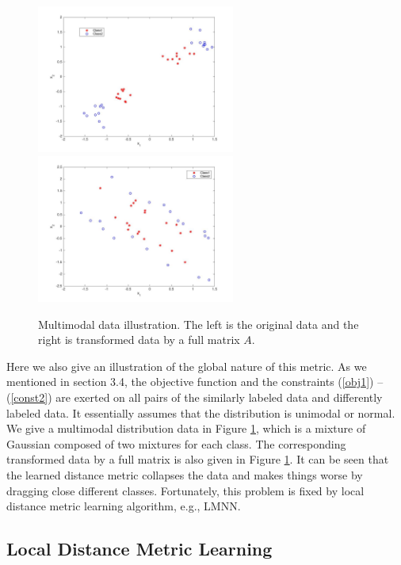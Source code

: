 \documentclass[12pt]{article}
\begin{document}
\begin{figure}[h!]
\centering
\includegraphics[width=6.5cm]{fig/mult-dat.jpg}
\includegraphics[width=6.5cm]{fig/mult-projected.jpg}
\caption{Multimodal data illustration. The left is the original data and the right is transformed data by a full matrix $A$.}
\label{fig3}
\end{figure}




Here we also give an illustration of the global nature of this metric. As we mentioned in section 3.4, the objective function and the constraints  (\ref{obj1}) -- (\ref{const2})  are exerted on all pairs of the similarly labeled data and differently labeled data. It essentially assumes that the distribution is unimodal or normal. We give a multimodal distribution data in Figure \ref{fig3}, which is a mixture of Gaussian composed of two mixtures for each class. The corresponding transformed data by a full matrix is also given in Figure \ref{fig3}. It can be seen that the learned distance metric collapses the data and makes things worse by dragging close different classes. Fortunately, this problem is fixed by local distance metric learning algorithm, e.g., LMNN.


\subsection{Local Distance Metric Learning}
\end{document}
